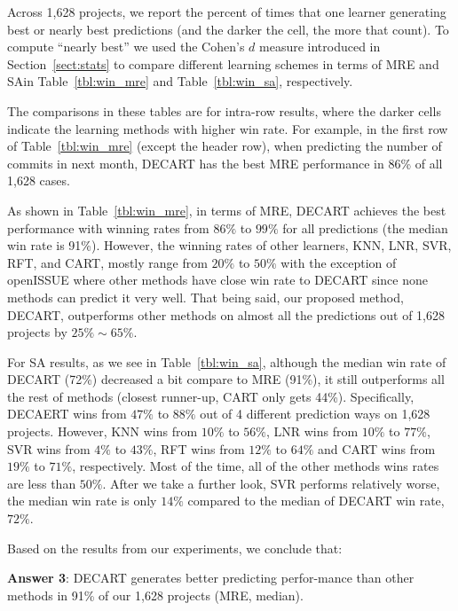\documentclass[sigconf,review,anonymous]{acmart}
\newcommand{\tbl}[1]{Table~\ref{tbl:#1}}
\begin{document}
Across 1,628 projects, we report the percent of times that one learner generating best or nearly best predictions (and the darker the cell, the more that count).  To compute ``nearly best'' we used the Cohen's $d$ measure introduced in Section~\ref{sect:stats} to compare different learning schemes in terms of MRE and SAin \tbl{win_mre} and \tbl{win_sa}, respectively.  

 The comparisons in these tables are for intra-row results, where the darker cells indicate the learning methods with higher win rate. For example, in the first row of \tbl{win_mre} (except the header row), when predicting the number of commits in next month, DECART has the best MRE performance in 86\% of all 1,628 cases. 

As shown in \tbl{win_mre}, in terms of MRE, DECART achieves the best performance with winning rates from $86\%$ to $99\%$ for all predictions (the median win rate is 91\%). However, the winning rates of other learners, KNN, LNR, SVR, RFT, and CART, mostly range from $20\%$ to $50\%$ with the exception of openISSUE where other methods have close win rate to DECART since none methods can predict it very well. That being said, our proposed method, DECART, outperforms other methods on almost all the predictions out of 1,628 projects by $25\% \sim 65\%$.


For SA results, as we see in \tbl{win_sa}, although the median win rate of DECART (72\%) decreased a bit compare to MRE (91\%), it still outperforms all the rest of methods (closest runner-up, CART only gets 44\%). Specifically, DECAERT wins from $47\%$ to $88\%$ out of 4 different prediction ways on 1,628 projects. However, KNN wins from $10\%$ to $56\%$, LNR wins from $10\%$ to $77\%$, SVR wins from $4\%$ to $43\%$, RFT wins from $12\%$ to $64\%$ and CART wins from $19\%$ to $71\%$, respectively. Most of the time, all of the other methods wins rates are less than $50\%$. After we take a further look, SVR performs relatively worse, the median win rate is only $14\%$ compared to the median of DECART win rate, $72\%$. 




Based on the results from our experiments, we conclude that:
 

\begin{blockquote}
\noindent
\textbf{Answer 3}: 
DECART generates better predicting perfor-mance than other methods in 91\% of our 1,628 projects (MRE, median).
\end{blockquote}
\end{document}
